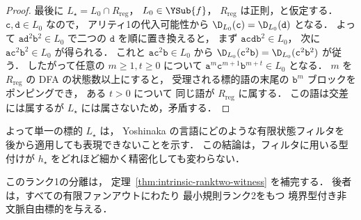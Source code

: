 \begin{proof}
最後に
$L_\star=L_0\cap R_{\mathrm{reg}}$，
$L_0\in\YSub{f}$，
$R_{\mathrm{reg}}$ は正則，と仮定する．
$\mathtt c,\mathtt d\in L_0$ なので，
アリティ1の代入可能性から
$\D_{L_0}(\mathtt c)=\D_{L_0}(\mathtt d)$
となる．
よって
$\mathtt a\mathtt d^2\mathtt b^2\in L_0$
で二つの $\mathtt d$ を順に置き換えると，
まず
$\mathtt a\mathtt c\mathtt d\mathtt b^2\in L_0$，
次に
$\mathtt a\mathtt c^2\mathtt b^2\in L_0$
が得られる．
これと
$\mathtt a\mathtt c^2\mathtt b\in L_0$
から
\(\D_{L_0}(\mathtt c^2\mathtt b) =\D_{L_0}(\mathtt c^2\mathtt b^2)\)
が従う．
したがって任意の $m\ge1,t\ge0$ について
$\mathtt a^m\mathtt c^{m+1}\mathtt b^{m+t}\in L_0$
となる．
$m$ を $R_{\mathrm{reg}}$ の DFA の状態数以上にすると，
受理される標的語の末尾の
$\mathtt b^m$ ブロックをポンピングでき，
ある $t>0$ について
同じ語が $R_{\mathrm{reg}}$ に属する．
この語は交差には属するが
$L_\star$ には属さないため，矛盾する．
\end{proof}

よって単一の標的 $L_\star$ は，
Yoshinaka の言語にどのような有限状態フィルタを
後から適用しても表現できないことを示す．
この結論は，フィルタに用いる型付けが
$h_\star$ をどれほど細かく精密化しても変わらない．

このランク1の分離は，
定理~\ref{thm:intrinsic-ranktwo-witness} を補完する．
後者は，すべての有限ファンアウトにわたり
最小規則ランク2をもつ
境界型付き非文脈自由標的を与える．

